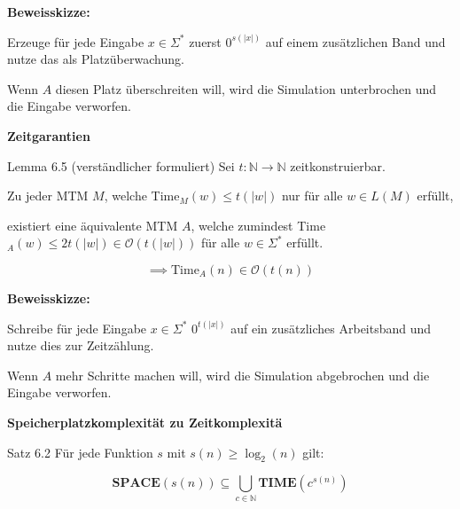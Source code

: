 \documentclass[a4paper, 11pt]{article}
\def\N{\mathbb{N}}
\def\O{\mathcal{O}}
\newcommand\myTitle[1]{{\large \textbf {#1}}}
\begin{document}
                            \textbf{Beweisskizze: }
                            
                            Erzeuge für jede Eingabe $x \in \Sigma^*$ zuerst $0^{s(|x|)}$ auf einem zusätzlichen Band und nutze das als Platzüberwachung. 
                            
                            
                            Wenn $A$ diesen Platz überschreiten will, wird die Simulation unterbrochen und die Eingabe verworfen.
                        
                        \myTitle{Zeitgarantien}
                            \begin{mainbox}{Lemma 6.5 (verständlicher formuliert)}
                                Sei $t: \N \to \N$ zeitkonstruierbar. 
                                
                                Zu jeder MTM $M$, welche Time$_M(w) \leq t(|w|)$ nur für alle $w \in L(M)$ erfüllt, 
                                
                                existiert eine äquivalente MTM $A$, welche zumindest Time$_A(w) \leq 2t(|w|) \in \O(t(|w|))$ für alle $w \in \Sigma^*$ erfüllt.
                        
                                $$\implies \text{Time}_A(n) \in \O(t(n))$$
                            \end{mainbox}
                            
                            \textbf{Beweisskizze: }
                            
                            Schreibe für jede Eingabe $x \in \Sigma^*$ $0^{t(|x|)}$ auf ein zusätzliches Arbeitsband und nutze dies zur Zeitzählung. 
                            
                            
                            Wenn $A$ mehr Schritte machen will, wird die Simulation abgebrochen und die Eingabe verworfen.
                        
                        \myTitle{Speicherplatzkomplexität zu Zeitkomplexitä}
                            \begin{mainbox}{Satz 6.2}
                                Für jede Funktion $s$ mit $s(n) \geq \log_2(n)$ gilt:
                        
                            $$\textbf{SPACE}(s(n)) \subseteq \bigcup_{c \in \N} \textbf{TIME}(c^{s(n)})$$
                            \end{mainbox}
                            
\end{document}
